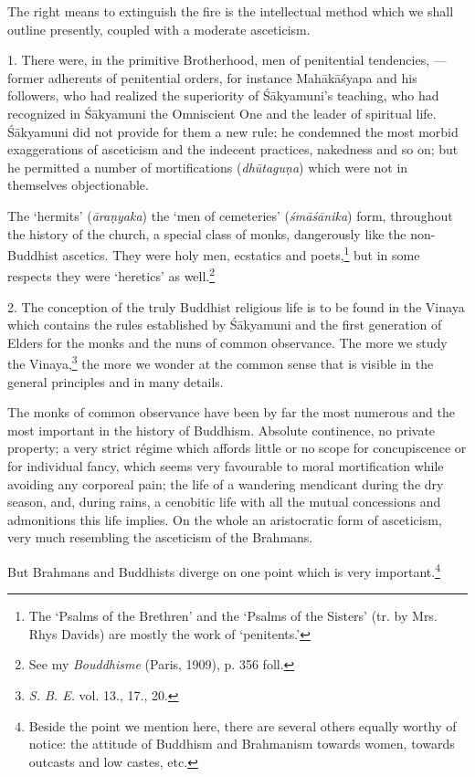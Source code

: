 \documentclass[a4paper, 11pt, oneside, english, landscape]{article}
\begin{document}
The right means to extinguish the fire is the intellectual method which we shall outline presently, coupled with a moderate asceticism.

1. There were, in the primitive Brotherhood, men of penitential tendencies, --- former adherents of penitential orders, for instance Mahākāśyapa and his followers, who had realized the superiority of Śākyamuni's teaching, who had recognized in Śākyamuni the Omniscient One and the leader of spiritual life. Śākyamuni did not provide for them a new rule: he condemned the most morbid exaggerations of asceticism and the indecent practices, nakedness and so on; but he permitted a number of mortifications (\emph{dhūtaguṇa}) which were not in themselves objectionable.

The `hermits' (\emph{āraṇyaka}) the `men of cemeteries' (\emph{śmāśānika}) form, throughout the history of the church, a special class of monks, dangerously like the non-Buddhist ascetics. They were holy men, ecstatics and poets,\footnote{The `Psalms of the Brethren' and the `Psalms of the Sisters' (tr. by Mrs. Rhys Davids) are mostly the work of `penitents.'} but in some respects they were `heretics' as well.\footnote{See my \emph{Bouddhisme} (Paris, 1909), p. 356 foll.}

2. The conception of the truly Buddhist religious life is to be found in the Vinaya which contains the rules established by Śākyamuni and the first generation of Elders for the monks and the nuns of common observance. The more we study the Vinaya,\footnote{\emph{S. B. E.} vol. 13., 17., 20.} the more we wonder at the common sense that is visible in the general principles and in many details.

The monks of common observance have been by far the most numerous and the most important in the history of Buddhism. Absolute continence, no private property; a very strict régime which affords little or no scope for concupiscence or for individual fancy, which seems very favourable to moral mortification while avoiding any corporeal pain; the life of a wandering mendicant during the dry season, and, during rains, a cenobitic life with all the mutual concessions and admonitions this life implies. On the whole an aristocratic form of asceticism, very much resembling the asceticism of the Brahmans.

But Brahmans and Buddhists diverge on one point which is very important.\footnote{Beside the point we mention here, there are several others equally worthy of notice: the attitude of Buddhism and Brahmanism towards women, towards outcasts and low castes, etc.}
\end{document}
